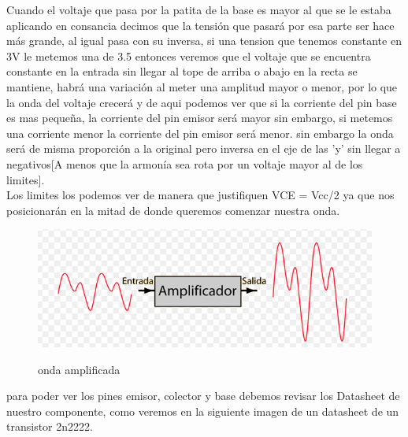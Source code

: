 \documentclass[letterpaper]{article}
\begin{document}
\begin{large}
Cuando el voltaje que pasa por la patita de la base es mayor al que se le estaba aplicando en consancia decimos que la tensión que pasará por esa parte ser hace más grande, al igual pasa con su inversa, si una tension que tenemos constante en 3V le metemos una de 3.5 entonces veremos que el voltaje que se encuentra constante en la entrada sin llegar al tope de arriba o abajo en la recta se mantiene, habrá una variación al meter una amplitud mayor o menor, por lo que la onda del voltaje crecerá y de aqui podemos ver que si la corriente del pin base es mas pequeña, la corriente del pin emisor será mayor sin embargo, si metemos una corriente menor la corriente del pin emisor será menor. 
sin embargo la onda será de misma proporción a la original pero inversa en el eje de las 'y'
sin llegar a negativos[A menos que la armonía sea rota por un voltaje mayor al de los limites].\\
Los limites los podemos ver de manera que justifiquen VCE = Vcc/2 ya que nos posicionarán en la mitad de donde queremos comenzar nuestra onda.
\begin{figure}[hbtp]
\caption{onda amplificada}
\centering
\includegraphics[scale=.6]{Imagenes/amp.png}\\
\end{figure}
para poder ver los pines emisor, colector y base debemos revisar los Datasheet de nuestro componente, como veremos en la siguiente imagen de un datasheet de un transistor 2n2222.\\
\newpage


\end{large}
\end{document}
